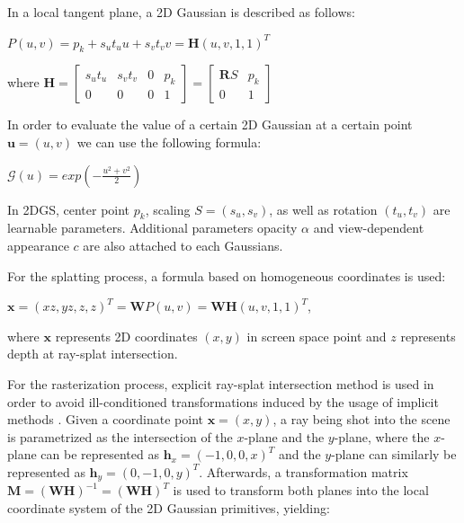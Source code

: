 In a local tangent plane, a 2D Gaussian is described as follows:

\begin{center}
    \(P(u, v) = p_k + s_u t_u u + s_v t_v v = \mathbf{H}(u, v, 1, 1)^T\)

    where \(\mathbf{H}=
    \begin{bmatrix}
        s_u t_u & s_v t_v & 0 & p_k \\
        0       & 0       & 0 & 1
    \end{bmatrix} 
    =
    \begin{bmatrix}
        \mathbf{R}S & p_k \\
        0           & 1
    \end{bmatrix}\)
\end{center}

In order to evaluate the value of a certain 2D Gaussian at a certain point \(\mathbf{u} = (u, v)\) we can use the following formula:

\begin{center}
    \(\mathcal{G}(u) = exp(-\frac{u^2 + v^2}{2})\)
\end{center}

In 2DGS, center point \(p_k\), scaling \(S = (s_u, s_v)\), as well as rotation \((t_u, t_v)\) are learnable parameters. Additional parameters opacity \(\alpha\) and view-dependent appearance \(c\) are also attached to each Gaussians.

For the splatting process, a formula based on homogeneous coordinates \parencite{splatting} is used:

\begin{center}
    \(\mathbf{x} = (xz, yz, z, z)^T = \mathbf{W}P(u,v) = \mathbf{WH}(u, v, 1, 1) ^ T\),
\end{center}

where \(\mathbf{x}\) represents 2D coordinates \((x, y)\) in screen space point and \(z\) represents depth at ray-splat intersection.

For the rasterization process, explicit ray-splat intersection \parencite{rayintersect} method is used in order to avoid ill-conditioned transformations induced by the usage of implicit methods \parencite{splatting}. Given a coordinate point \(\mathbf{x} = (x, y)\), a ray being shot into the scene is parametrized as the intersection of the \(x\)-plane and the \(y\)-plane, where the \(x\)-plane can be represented as \(\mathbf{h}_x = (-1, 0, 0, x)^T\) and the \(y\)-plane can similarly be represented as \(\mathbf{h}_y = (0, -1, 0, y)^T\). Afterwards, a transformation matrix \(\mathbf{M} = (\mathbf{WH})^{-1} = (\mathbf{WH})^T\) is used to transform both planes into the local coordinate system of the 2D Gaussian primitives, yielding:

